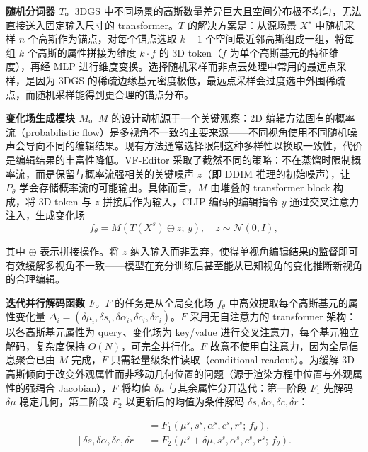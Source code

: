 \textbf{随机分词器 $T$}。3DGS 中不同场景的高斯数量差异巨大且空间分布极不均匀，无法直接送入固定输入尺寸的 transformer。$T$ 的解决方案是：从源场景 $X^s$ 中随机采样 $n$ 个高斯作为锚点，对每个锚点选取 $k-1$ 个空间最近邻高斯组成一组，将每组 $k$ 个高斯的属性拼接为维度 $k \cdot f$ 的 3D token（$f$ 为单个高斯基元的特征维度），再经 MLP 进行维度变换。选择随机采样而非点云处理中常用的最远点采样，是因为 3DGS 的稀疏边缘基元密度极低，最远点采样会过度选中外围稀疏点，而随机采样能得到更合理的锚点分布。

\textbf{变化场生成模块 $M$}。$M$ 的设计动机源于一个关键观察：2D 编辑方法固有的概率流（probabilistic flow）是多视角不一致的主要来源——不同视角使用不同随机噪声会导向不同的编辑结果。现有方法通常选择限制这种多样性以换取一致性，代价是编辑结果的丰富性降低。VF-Editor 采取了截然不同的策略：不在蒸馏时限制概率流，而是保留与概率流强相关的关键噪声 $z$（即 DDIM 推理的初始噪声），让 $P_\theta$ 学会存储概率流的可能输出。具体而言，$M$ 由堆叠的 transformer block 构成，将 3D token 与 $z$ 拼接后作为输入，CLIP 编码的编辑指令 $y$ 通过交叉注意力注入，生成变化场
\begin{equation}
f_\theta = M(T(X^s) \oplus z;\, y),\quad z \sim \mathcal{N}(0,I),
\end{equation}

其中 $\oplus$ 表示拼接操作。将 $z$ 纳入输入而非丢弃，使得单视角编辑结果的监督即可有效缓解多视角不一致——模型在充分训练后甚至能从已知视角的变化推断新视角的合理编辑。

\textbf{迭代并行解码函数 $F$}。$F$ 的任务是从全局变化场 $f_\theta$ 中高效提取每个高斯基元的属性变化量 $\Delta_i = (\delta\mu_i, \delta s_i, \delta\alpha_i, \delta c_i, \delta r_i)$。$F$ 采用无自注意力的 transformer 架构：以各高斯基元属性为 query、变化场为 key/value 进行交叉注意力，每个基元独立解码，复杂度保持 $O(N)$，可完全并行化。$F$ 故意不使用自注意力，因为全局信息聚合已由 $M$ 完成，$F$ 只需轻量级条件读取（conditional readout）。为缓解 3D 高斯倾向于改变外观属性而非移动几何位置的问题（源于渲染方程中位置与外观属性的强耦合 Jacobian），$F$ 将均值 $\delta\mu$ 与其余属性分开迭代：第一阶段 $F_1$ 先解码 $\delta\mu$ 稳定几何，第二阶段 $F_2$ 以更新后的均值为条件解码 $\delta s, \delta\alpha, \delta c, \delta r$：

\begin{align}
[\delta\mu] &= F_1(\mu^s, s^s, \alpha^s, c^s, r^s;\, f_\theta),\\
[\delta s, \delta\alpha, \delta c, \delta r] &= F_2(\mu^s + \delta\mu, s^s, \alpha^s, c^s, r^s;\, f_\theta).
\end{align}

